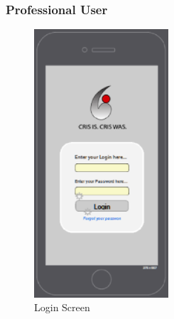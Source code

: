\subsubsection{Professional User}
\begin{figure}[htbp]
\begin{center}
 \caption{\label{fig:A0} Login Screen}
   \includegraphics[width=50mm]{./images/App/login.eps}
\end{center}
\end{figure}
